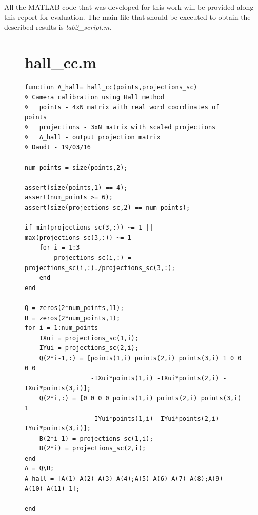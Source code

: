 \documentclass[journal]{IEEEtran}
\begin{document}
All the MATLAB code that was developed for this work will be provided along this report for evaluation. The main file that should be executed to obtain the described results is \textit{lab2\_script.m}.


\appendices

\begin{figure}[p]
\section{hall\_cc.m}\label{hall}
    \begin{verbatim}
function A_hall= hall_cc(points,projections_sc)
% Camera calibration using Hall method
%   points - 4xN matrix with real word coordinates of points
%   projections - 3xN matrix with scaled projections
%   A_hall - output projection matrix
% Daudt - 19/03/16

num_points = size(points,2);

assert(size(points,1) == 4);
assert(num_points >= 6);
assert(size(projections_sc,2) == num_points);

if min(projections_sc(3,:)) ~= 1 || max(projections_sc(3,:)) ~= 1
    for i = 1:3
        projections_sc(i,:) = projections_sc(i,:)./projections_sc(3,:);
    end
end

Q = zeros(2*num_points,11);
B = zeros(2*num_points,1);
for i = 1:num_points
    IXui = projections_sc(1,i);
    IYui = projections_sc(2,i);
    Q(2*i-1,:) = [points(1,i) points(2,i) points(3,i) 1 0 0 0 0 
                  -IXui*points(1,i) -IXui*points(2,i) -IXui*points(3,i)];
    Q(2*i,:) = [0 0 0 0 points(1,i) points(2,i) points(3,i) 1 
                  -IYui*points(1,i) -IYui*points(2,i) -IYui*points(3,i)];
    B(2*i-1) = projections_sc(1,i);
    B(2*i) = projections_sc(2,i);
end
A = Q\B;
A_hall = [A(1) A(2) A(3) A(4);A(5) A(6) A(7) A(8);A(9) A(10) A(11) 1];

end
\end{verbatim}
\end{figure}
\end{document}
